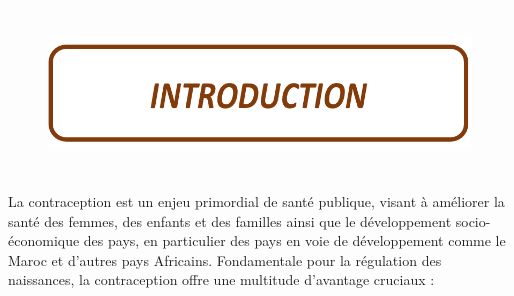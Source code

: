 \pagebreak


\setcounter{page}{1} %


\begin{itemize}
  \item[\textcolor{white}{$\Box$}] 
\end{itemize}


\vspace{7cm}

\begin{figure}[H]
  \includegraphics{Images/introduction.png}
\end{figure}

\pagebreak

\setcounter{page}{2} %

\section*{}


\noindent La contraception est un enjeu primordial de santé publique, visant à améliorer la santé des femmes, des enfants et des familles ainsi que le développement socio-économique des pays, en particulier des pays en voie de développement comme le Maroc et d’autres pays Africains. Fondamentale pour la régulation des naissances, la contraception offre une multitude d’avantage cruciaux : 

